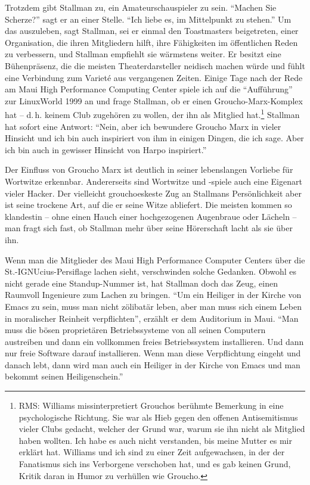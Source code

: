 Trotzdem gibt Stallman zu, ein Amateurschauspieler zu sein. "`Machen Sie Scherze?"' sagt er an einer Stelle. "`Ich liebe es, im Mittelpunkt zu stehen."' Um das auszuleben, sagt Stallman, sei er einmal den Toastmasters beigetreten, einer Organisation, die ihren Mitgliedern hilft, ihre Fähigkeiten im öffentlichen Reden zu verbessern, und Stallman empfiehlt sie wärmstens weiter. Er besitzt eine Bühenpräsenz, die die meisten Theaterdarsteller neidisch machen würde und fühlt eine Verbindung zum Varieté aus vergangenen Zeiten. Einige Tage nach der Rede am Maui High Performance Computing Center spiele ich auf die "`Aufführung"' zur LinuxWorld 1999 an und frage Stallman, ob er einen Groucho-Marx-Komplex hat – d.\,h. keinem Club zugehören zu wollen, der ihn als Mitglied hat.\footnote{RMS: Williams missinterpretiert Grouchos berühmte Bemerkung in eine psychologische Richtung. Sie war als Hieb gegen den offenen Antisemitismus vieler Clubs gedacht, welcher der Grund war, warum sie ihn nicht als Mitglied haben wollten. Ich habe es auch nicht verstanden, bis meine Mutter es mir erklärt hat. Williams und ich sind zu einer Zeit aufgewachsen, in der der Fanatismus sich ins Verborgene verschoben hat, und es gab keinen Grund, Kritik daran in Humor zu verhüllen wie Groucho.} Stallman hat sofort eine Antwort: "`Nein, aber ich bewundere Groucho Marx in vieler Hinsicht und ich bin auch inspiriert von ihm in einigen Dingen, die ich sage. Aber ich bin auch in gewisser Hinsicht von Harpo inspiriert."'

Der Einfluss von Groucho Marx ist deutlich in seiner lebenslangen Vorliebe für Wortwitze erkennbar. Andererseits sind Wortwitze und -spiele auch eine Eigenart vieler Hacker. Der vielleicht grouchoeskeste Zug an Stallmans Persönlichkeit aber ist seine trockene Art, auf die er seine Witze abliefert. Die meisten kommen so klandestin – ohne einen Hauch einer hochgezogenen Augenbraue oder Lächeln – man fragt sich fast, ob Stallman mehr über seine Hörerschaft lacht als sie über ihn.

Wenn man die Mitglieder des Maui High Performance Computer Centers über die St.-IGNUcius-Persiflage lachen sieht, verschwinden solche Gedanken. Obwohl es nicht gerade eine Standup-Nummer ist, hat Stallman doch das Zeug, einen Raumvoll Ingenieure zum Lachen zu bringen. "`Um ein Heiliger in der Kirche von Emacs zu sein, muss man nicht zölibatär leben, aber man muss sich einem Leben in moralischer Reinheit verpflichten"', erzählt er dem Auditorium in Maui. "`Man muss die bösen proprietären Betriebssysteme von all seinen Computern austreiben und dann ein vollkommen freies Betriebssystem installieren. Und dann nur freie Software darauf installieren. Wenn man diese Verpflichtung eingeht und danach lebt, dann wird man auch ein Heiliger in der Kirche von Emacs und man bekommt seinen Heiligenschein."'


